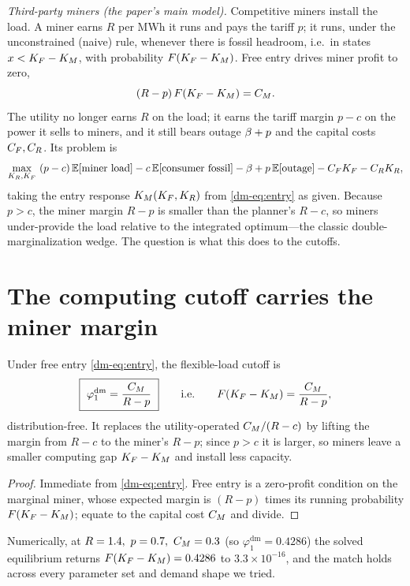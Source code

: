 \emph{Third-party miners (the paper's main model).} Competitive miners install the load. A
miner earns $R$ per MWh it runs and pays the tariff $p$; it runs, under the unconstrained
(naive) rule, whenever there is fossil headroom, i.e.\ in states $x<K_F-K_M$, with probability
$F(K_F-K_M)$. Free entry drives miner profit to zero,
\begin{equation}\label{dm-eq:entry}
  (R-p)\,F(K_F-K_M)=C_M .
\end{equation}
The utility no longer earns $R$ on the load; it earns the tariff margin $p-c$ on the power it
sells to miners, and it still bears outage $\beta+p$ and the capital costs $C_F,C_R$. Its problem
is
\begin{equation}\label{dm-eq:util}
  \max_{K_R,K_F}\ (p-c)\,\mathbb{E}[\text{miner load}] - c\,\mathbb{E}[\text{consumer fossil}]
  - \beta+p\,\mathbb{E}[\text{outage}] - C_FK_F - C_RK_R,
\end{equation}
taking the entry response $K_M(K_F,K_R)$ from \eqref{dm-eq:entry} as given. Because $p>c$, the
miner margin $R-p$ is smaller than the planner's $R-c$, so miners under-provide the load
relative to the integrated optimum---the classic double-marginalization wedge. The question is
what this does to the cutoffs.

\section{The computing cutoff carries the miner margin}
\begin{proposition}\label{dm-prop:phi1}
Under free entry \eqref{dm-eq:entry}, the flexible-load cutoff is
\[
  \boxed{\ \varphi_1^{\mathrm{dm}}=\frac{\CM}{R-p}\ }
  \qquad\text{i.e.}\qquad F(\KF-\KM)=\frac{\CM}{R-p},
\]
distribution-free. It replaces the utility-operated $C_M/(R-c)$ by lifting the margin from
$R-c$ to the miner's $R-p$; since $p>c$ it is larger, so miners leave a smaller computing gap
$K_F-K_M$ and install less capacity.
\end{proposition}
\begin{proof}
Immediate from \eqref{dm-eq:entry}. Free entry is a zero-profit condition on the marginal miner,
whose expected margin is $(R-p)$ times its running probability $F(K_F-K_M)$; equate to the
capital cost $C_M$ and divide.
\end{proof}

Numerically, at $R=1.4,\ p=0.7,\ \CM=0.3$ (so $\varphi_1^{\mathrm{dm}}=0.4286$) the solved
equilibrium returns $F(K_F-K_M)=0.4286$ to $3.3\times10^{-16}$, and the match holds across
every parameter set and demand shape we tried.

